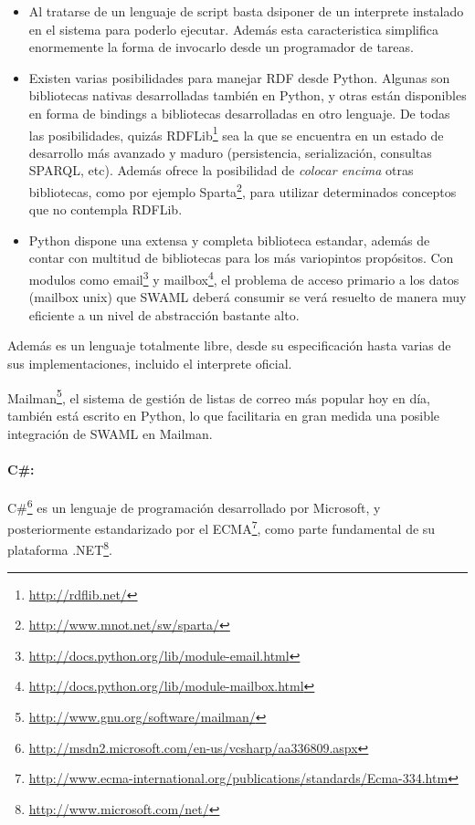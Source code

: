 \begin{itemize}
  \item Al tratarse de un lenguaje de script basta dsiponer de un interprete 
	instalado en el sistema para poderlo ejecutar. Además esta caracteristica
	simplifica enormemente la forma de invocarlo desde un programador de
	tareas.
  \item Existen varias posibilidades para manejar RDF desde Python. Algunas son
	bibliotecas nativas desarrolladas también en Python, y otras están
	disponibles en forma de bindings a bibliotecas desarrolladas en otro 
	lenguaje.
	De todas las posibilidades, quizás RDFLib\footnote{\url{http://rdflib.net/}}
	sea la que se encuentra en un estado de desarrollo más avanzado y maduro 
	(persistencia, serialización, consultas SPARQL, etc).
	Además ofrece la posibilidad de \emph{colocar encima} otras bibliotecas,
	como por ejemplo Sparta\footnote{\url{http://www.mnot.net/sw/sparta/}},
	para utilizar determinados conceptos que no contempla RDFLib.
  \item Python dispone una extensa y completa biblioteca estandar, además de contar
	con multitud de bibliotecas para los más variopintos propósitos. Con modulos 
	como email\footnote{\url{http://docs.python.org/lib/module-email.html}} y
	mailbox\footnote{\url{http://docs.python.org/lib/module-mailbox.html}}, el
	problema de acceso primario a los datos (mailbox unix) que SWAML deberá
	consumir se verá resuelto de manera muy eficiente a un nivel de abstracción
	bastante alto.
\end{itemize}

Además es un lenguaje totalmente libre, desde su especificación hasta varias
de sus implementaciones, incluido el interprete oficial.

Mailman\footnote{\url{http://www.gnu.org/software/mailman/}}, el sistema de gestión
de listas de correo más popular hoy en día, también está escrito en Python, lo que 
facilitaria en gran medida una posible integración de SWAML en Mailman.


\paragraph{C\#:}C\#\footnote{\url{http://msdn2.microsoft.com/en-us/vcsharp/aa336809.aspx}} 
es un lenguaje de programación desarrollado por Microsoft, y posteriormente estandarizado por el ECMA\footnote{\url{http://www.ecma-international.org/publications/standards/Ecma-334.htm}},
como parte fundamental de su plataforma .NET\footnote{\url{http://www.microsoft.com/net/}}.

